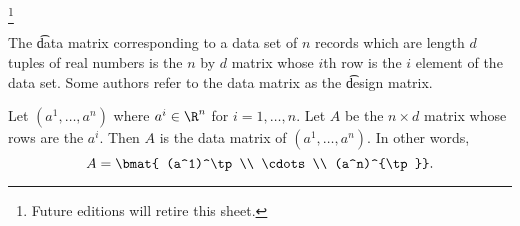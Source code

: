 
  \ifhmode\unskip\fi\footnote{
Future editions will retire this sheet.
  }


The \t{data matrix} corresponding to a data set of $n$ records which are length $d$ tuples of real numbers is the $n$ by $d$ matrix whose $i$th row is the $i$ element of the data set.
Some authors refer to the data matrix as the \t{design matrix}.


Let $(a^1, \dots , a^n)$ where $a^i \in \R ^n$ for $i = 1, \dots , n$.
Let $A$ be the $n \times  d$ matrix whose rows are the $a^i$. Then $A$ is the data matrix of $(a^1, \dots , a^n)$.
In other words,
  \[
A = \bmat{ (a^1)^\tp \\ \cdots \\ (a^n)^{\tp}}.
  \]

\blankpage
